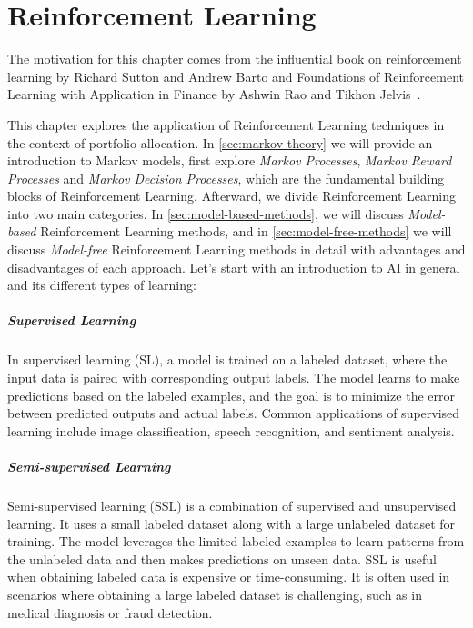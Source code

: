 \documentclass[../xlapes02]{subfiles}
\begin{document}
    \chapter{Reinforcement Learning}\label{ch:reinforcement-learning}

    The motivation for this chapter comes from the influential book on reinforcement learning by Richard Sutton and Andrew Barto and Foundations of Reinforcement Learning with Application in Finance by Ashwin Rao and Tikhon Jelvis~\cite{rao2022foundations, sutton2018reinforcement}.

    This chapter explores the application of Reinforcement Learning techniques in the context of portfolio allocation. In \cref{sec:markov-theory} we will provide an introduction to Markov models, first explore \emph{Markov Processes}, \emph{Markov Reward Processes} and \emph{Markov Decision Processes}, which are the fundamental building blocks of Reinforcement Learning. Afterward, we divide Reinforcement Learning into two main categories. In \cref{sec:model-based-methods}, we will discuss \emph{Model-based} Reinforcement Learning methods, and in \cref{sec:model-free-methods} we will discuss \emph{Model-free} Reinforcement Learning methods in detail with advantages and disadvantages of each approach. Let's start with an introduction to AI in general and its different types of learning:

    \paragraph{Supervised Learning}
    In supervised learning (SL), a model is trained on a labeled dataset, where the input data is paired with corresponding output labels. The model learns to make predictions based on the labeled examples, and the goal is to minimize the error between predicted outputs and actual labels. Common applications of supervised learning include image classification, speech recognition, and sentiment analysis.

    \paragraph{Semi-supervised Learning}
    Semi-supervised learning (SSL) is a combination of supervised and unsupervised learning. It uses a small labeled dataset along with a large unlabeled dataset for training. The model leverages the limited labeled examples to learn patterns from the unlabeled data and then makes predictions on unseen data. SSL is useful when obtaining labeled data is expensive or time-consuming. It is often used in scenarios where obtaining a large labeled dataset is challenging, such as in medical diagnosis or fraud detection.
\end{document}
